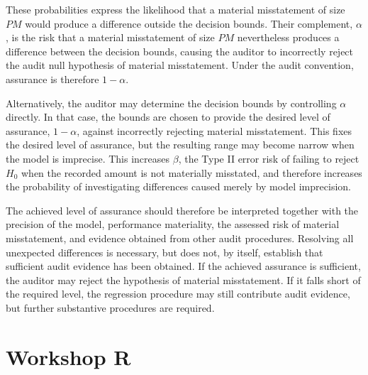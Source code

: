 These probabilities express the likelihood that a material misstatement of size $PM$ would produce a difference outside the decision bounds. Their complement, $\alpha$, is the risk that a material misstatement of size $PM$ nevertheless produces a difference between the decision bounds, causing the auditor to incorrectly reject the audit null hypothesis of material misstatement. Under the audit convention, assurance is therefore $1-\alpha$.

\bigskip
Alternatively, the auditor may determine the decision bounds by controlling $\alpha$ directly. In that case, the bounds are chosen to provide the desired level of assurance, $1-\alpha$, against incorrectly rejecting material misstatement. This fixes the desired level of assurance, but the resulting range may become narrow when the model is imprecise. This increases $\beta$, the Type II error risk of failing to reject $H_0$ when the recorded amount is not materially misstated, and therefore increases the probability of investigating differences caused merely by model imprecision.

The achieved level of assurance should therefore be interpreted together with the precision of the model, performance materiality, the assessed risk of material misstatement, and evidence obtained from other audit procedures. Resolving all unexpected differences is necessary, but does not, by itself, establish that sufficient audit evidence has been obtained. If the achieved assurance is sufficient, the auditor may reject the hypothesis of material misstatement. If it falls short of the required level, the regression procedure may still contribute audit evidence, but further substantive procedures are required.




\section{Workshop R} %
\label{sec:workshop_7_R}

